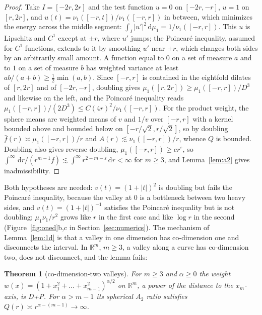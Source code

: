 \documentclass[11pt]{amsart}
\newcommand{\R}{\mathbb{R}}
\newcommand{\dd}{\,\mathrm{d}}
\newcommand{\abs}[1]{\lvert #1\rvert}
\newcommand{\fbar}{\bar f}
\theoremstyle{plain}
\newtheorem{theorem}{Theorem}[section]
\theoremstyle{definition}
\theoremstyle{remark}
\begin{document}
\begin{proof}
Take $I=[-2r,2r]$ and the test function $u=0$ on $[-2r,-r]$, $u=1$ on $[r,2r]$,
and $u(t)=\nu_1([-r,t])/\nu_1([-r,r])$ in between, which minimizes the energy
across the middle segment: $\int_I\abs{u'}^2\dd\mu_1=1/\nu_1([-r,r])$. This $u$
is Lipschitz and $C^1$ except at $\pm r$, where $u'$ jumps; the Poincar\'e
inequality, assumed for $C^1$ functions, extends to it by smoothing $u'$ near
$\pm r$, which changes both sides by an arbitrarily small amount. A function
equal to $0$ on a set of measure $a$ and to $1$ on a set of measure $b$ has
weighted variance at least $ab/(a+b)\ge\frac12\min(a,b)$. Since $[-r,r]$ is
contained in the eightfold dilates of $[r,2r]$ and of $[-2r,-r]$, doubling gives
$\mu_1([r,2r])\ge\mu_1([-r,r])/D^3$ and likewise on the left, and the Poincar\'e
inequality reads $\mu_1([-r,r])/(2D^3)\le C(4r)^2/\nu_1([-r,r])$. For the product
weight, the sphere means are weighted means of $v$ and $1/v$ over $[-r,r]$
with a kernel bounded above and bounded below on $[-r/\sqrt2,r/\sqrt2]$, so by
doubling $\fbar(r)\asymp\mu_1([-r,r])/r$ and $A(r)\lesssim\nu_1([-r,r])/r$,
whence $Q$ is bounded. Doubling also gives reverse doubling,
$\mu_1([-r,r])\ge cr^\varepsilon$, so $\int^\infty\dd r/(r^{m-1}\fbar)\lesssim
\int^\infty r^{2-m-\varepsilon}\dd r<\infty$ for $m\ge3$, and Lemma~\ref{lem:a2}
gives inadmissibility.
\end{proof}

Both hypotheses are needed: $v(t)=(1+\abs t)^2$ is doubling but fails the
Poincar\'e inequality, because the valley at $0$ is a bottleneck between two
heavy sides, and $v(t)=(1+\abs t)^{-1}$ satisfies the Poincar\'e inequality
but is not doubling; $\mu_1\nu_1/r^2$ grows like $r$ in the first case and like
$\log r$ in the second (Figure~\ref{fig:oned}b,c in Section~\ref{sec:numerics}). The mechanism of Lemma~\ref{lem:1d} is that a valley
in one dimension has co-dimension one and disconnects the interval. In $\R^m$,
$m\ge3$, a valley along a curve has co-dimension two, does not disconnect, and
the lemma fails:

\begin{theorem}[co-dimension-two valleys]\label{thm:cyl}
For $m\ge3$ and $\alpha\ge0$ the weight
$w(x)=(1+x_1^2+\dots+x_{m-1}^2)^{\alpha/2}$ on $\R^m$, a power of the distance to
the $x_m$-axis, is D+P. For $\alpha>m-1$ its spherical $A_2$ ratio satisfies
$Q(r)\asymp r^{\alpha-(m-1)}\to\infty$.
\end{theorem}
\end{document}
